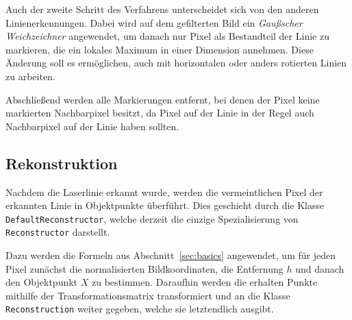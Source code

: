 \documentclass[ngerman,a4paper,parskip=half]{scrartcl}
\begin{document}
Auch der zweite Schritt des Verfahrens unterscheidet sich von den anderen Linienerkennungen. Dabei wird auf dem gefilterten Bild ein \emph{Gaußscher Weichzeichner} angewendet, um danach nur Pixel als Bestandteil der Linie zu markieren, die ein lokales Maximum in einer Dimension annehmen. Diese Änderung soll es ermöglichen, auch mit horizontalen oder anders rotierten Linien zu arbeiten.

Abschließend werden alle Markierungen entfernt, bei denen der Pixel keine markierten Nachbarpixel besitzt, da Pixel auf der Linie in der Regel auch Nachbarpixel auf der Linie haben sollten.

\subsection{Rekonstruktion}

Nachdem die Laserlinie erkannt wurde, werden die vermeintlichen Pixel der erkannten Linie in Objektpunkte überführt. Dies geschieht durch die Klasse \texttt{DefaultReconstructor}, welche derzeit die einzige Spezialisierung von \texttt{Reconstructor} darstellt.

Dazu werden die Formeln aus Abschnitt~\ref{sec:basics} angewendet, um für jeden Pixel zunächst die normalisierten Bildkoordinaten, die Entfernung $h$ und danach den Objektpunkt $X$ zu bestimmen. Daraufhin werden die erhalten Punkte mithilfe der Transformationsmatrix transformiert und an die Klasse \texttt{Reconstruction} weiter gegeben, welche sie letztendlich ausgibt.
	
\end{document}
